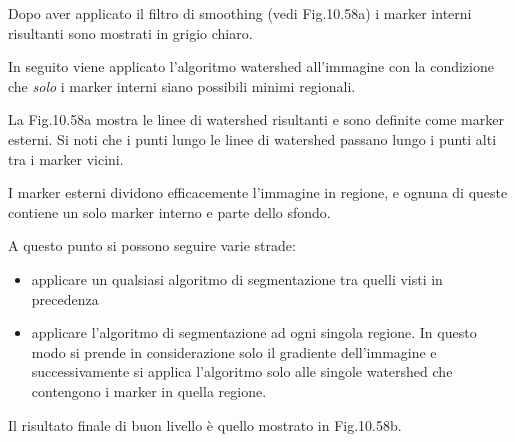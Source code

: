 Dopo aver applicato il filtro di smoothing (vedi Fig.10.58a) i marker interni risultanti sono mostrati in grigio chiaro.

In seguito viene applicato l'algoritmo watershed all'immagine con la condizione che \textit{solo} i marker interni siano possibili minimi regionali.

La Fig.10.58a mostra le linee di watershed risultanti e sono definite come marker esterni. Si noti che i punti lungo le linee di watershed passano lungo i punti alti tra i marker vicini.

I marker esterni dividono efficacemente l'immagine in regione, e ognuna di queste contiene un solo marker interno e parte dello sfondo.

A questo punto si possono seguire varie strade:
\begin{itemize}
	\item applicare un qualsiasi algoritmo di segmentazione tra quelli visti in precedenza
	
	\item applicare l'algoritmo di segmentazione ad ogni singola regione. In questo modo si prende in considerazione solo il gradiente dell'immagine e successivamente si applica l'algoritmo solo alle singole watershed che contengono i marker in quella regione.
\end{itemize}

Il risultato finale di buon livello è quello mostrato in Fig.10.58b.